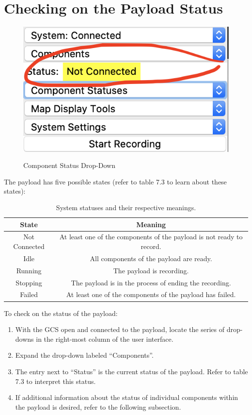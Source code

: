\documentclass{report}
\begin{document}
	\section{Checking on the Payload Status}
		\begin{figure}[htb]
			\centering
			\caption{Component Status Drop-Down}
			\includegraphics[scale=0.5]{component_status_dd.jpg}
			\label{fig:component_status_dd}
		\end{figure}
		The payload has five possible states (refer to table 7.3 to learn about these states): 
		\begin{table}[htb]
			\centering
			\caption{System statuses and their respective meanings.}
			\begin{tabular}{||c c||}
			\hline
			State & Meaning\\ [0.5ex]
			\hline\hline
			Not Connected & At least one of the components of the payload is not ready to record. \\
			\hline
			Idle & All components of the payload are ready. \\
			\hline
			Running & The payload is recording. \\
			\hline
			Stopping & The payload is in the process of ending the recording. \\
			\hline
			Failed & At least one of the components of the payload has failed. \\ [1ex]
			\hline
			\end{tabular}
		\end{table}
		To check on the status of the payload:
		\begin{enumerate}
			\item With the GCS open and connected to the payload, locate the series of drop-downs in the right-most column of the user interface.
			\item Expand the drop-down labeled ``Components''.
			\item The entry next to ``Status'' is the current status of the payload. Refer to table 7.3 to interpret this status.
			\item If additional information about the status of individual components within the payload is desired, refer to the following subsection.
		\end{enumerate}
\end{document}
